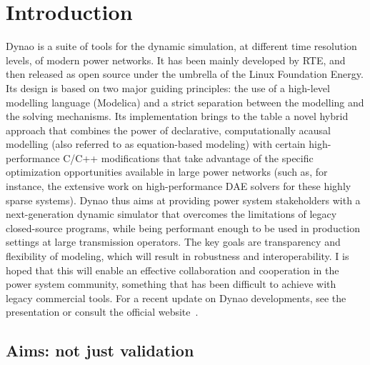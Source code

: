 \documentclass[conference]{IEEEtran}
\newcommand{\Dynawo}{Dyna\textomega o} %
\begin{document}
\section{Introduction}

\Dynawo{}\cite{Guironnet18} is a suite of tools for the dynamic simulation, at
different time resolution levels, of modern power networks. It has been mainly
developed by RTE, and then released as open source under the umbrella of the
Linux Foundation Energy.  Its design is based on two major guiding principles:
the use of a high-level modelling language (Modelica) and a strict separation
between the modelling and the solving mechanisms.  Its implementation brings to
the table a novel hybrid approach that combines the power of declarative,
computationally acausal modelling (also referred to as equation-based modeling)
with certain high-performance C/C++ modifications that take advantage of the
specific optimization opportunities available in large power networks (such as,
for instance, the extensive work on high-performance DAE solvers for these
highly sparse systems).  \Dynawo{} thus aims at providing power system
stakeholders with a next-generation dynamic simulator that overcomes the
limitations of legacy closed-source programs, while being performant enough to
be used in production settings at large transmission operators. The key goals
are transparency and flexibility of modeling, which will result in robustness
and interoperability. I is hoped that this will enable an effective
collaboration and cooperation in the power system community, something that has
been difficult to achieve with legacy commercial tools.  For a recent update on
\Dynawo{} developments, see the presentation \cite{Guironnet21} or consult the
official website~\cite{Dynawo}.



\subsection{Aims: not just validation}

\end{document}
